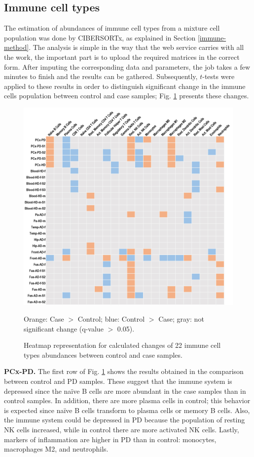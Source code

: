 \subsection{Immune cell types}

The estimation of abundances of immune cell types from a mixture cell population was done by CIBERSORTx, as explained in Section \ref{immune-method}. The analysis is simple in the way that the web service carries with all the work, the important part is to upload the required matrices in the correct form. After imputing the corresponding data and parameters, the job takes a few minutes to finish and the results can be gathered. Subsequently, $t$-tests were applied to these results in order to distinguish significant change in the immune cells population between control and case samples; Fig. \ref{fig:cibersort} presents these changes.

\begin{figure}[ht]
    \centerline{\includegraphics[width = 13cm]{Figures/immune.jpg}}
\caption{Heatmap representation for calculated changes of 22 immune cell types abundances between control and case samples.}
\footnotesize Orange: Case $>$ Control; blue: Control $>$ Case; gray: not significant change (q-value $>$ 0.05).
\label{fig:cibersort}
\end{figure}

\textbf{PCx-PD.} The first row of Fig. \ref{fig:cibersort} shows the results obtained in the comparison between control and PD samples. These suggest that the immune system is depressed since the naïve B cells are more abundant in the case samples than in control samples. In addition, there are more plasma cells in control; this behavior is expected since naïve B cells transform to plasma cells or memory B cells. Also, the immune system could be depressed in PD because the population of resting NK cells increased, while in control there are more activated NK cells. Lastly, markers of inflammation are higher in PD than in control: monocytes, macrophages M2, and neutrophils.

